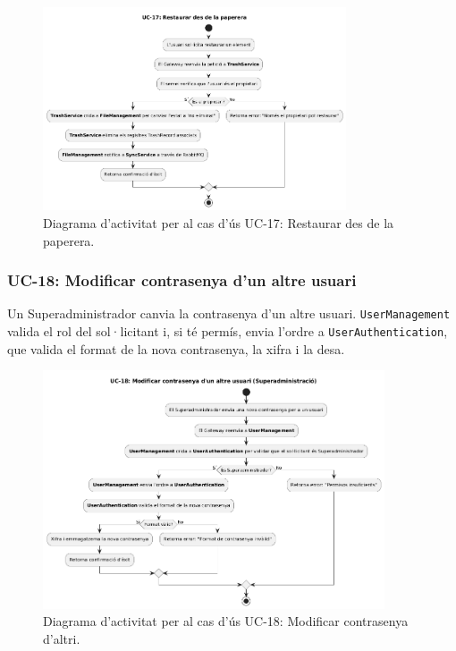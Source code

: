 \begin{figure}[H]
    \centering
    \includegraphics[width=0.8\textwidth]{Figures/ad_UC17.png}
    \caption{Diagrama d'activitat per al cas d'ús UC-17: Restaurar des de la paperera.}
    \label{fig:ad_uc17_app}
\end{figure}

\subsubsection{UC-18: Modificar contrasenya d'un altre usuari}
Un Superadministrador canvia la contrasenya d'un altre usuari. \texttt{UserManagement} valida el rol del sol·licitant i, si té permís, envia l'ordre a \texttt{UserAuthentication}, que valida el format de la nova contrasenya, la xifra i la desa.

\begin{figure}[H]
    \centering
    \includegraphics[width=0.9\textwidth]{Figures/ad_UC18.png}
    \caption{Diagrama d'activitat per al cas d'ús UC-18: Modificar contrasenya d'altri.}
    \label{fig:ad_uc18_app}
\end{figure}

